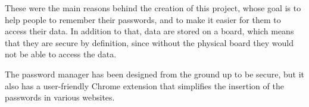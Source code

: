 These were the main reasons behind the creation of this project, whose goal is to help people to remember their passwords, and to make it easier for them to access their data. In addition to that, data are stored on a board, which means that they are secure by definition, since without the physical board they would not be able to access the data. 

The password manager has been designed from the ground up to be secure, but it also has a user-friendly Chrome extension that simplifies the insertion of the passwords in various websites.